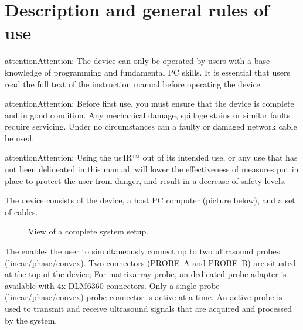 \documentclass[letterpaper,10pt,english]{sphinxmanual}
\begin{document}
\sphinxstepscope


\chapter{Description and general rules of use}
\label{\detokenize{content/hardware:description-and-general-rules-of-use}}\label{\detokenize{content/hardware::doc}}
\begin{sphinxadmonition}{attention}{Attention:}
\sphinxAtStartPar
The device can only be operated by users with a base knowledge of programming and fundamental PC skills. It is essential that users read the full text of the instruction manual before operating the device.
\end{sphinxadmonition}

\begin{sphinxadmonition}{attention}{Attention:}
\sphinxAtStartPar
Before first use, you must ensure that the device is complete and in good condition. Any mechanical damage, spillage stains or similar faults require servicing. Under no circumstances can a faulty or damaged network cable be used.
\end{sphinxadmonition}

\begin{sphinxadmonition}{attention}{Attention:}
\sphinxAtStartPar
Using the us4R™ out of its intended use, or any use that has not been delineated in this manual, will lower the effectiveness of measures put in place to protect the user from danger, and result in a decrease of safety levels.
\end{sphinxadmonition}

\sphinxAtStartPar
The device consists of the  device, a host PC computer (picture below), and a set of cables.

\begin{figure}[htbp]
\centering
\capstart

\noindent{}
\caption{View of a complete system setup.}\label{\detokenize{content/hardware:id1}}\end{figure}

\sphinxAtStartPar
{}

\sphinxAtStartPar
The  enables the user to simultaneously connect up to two ultrasound probes (linear/phase/convex). Two connectors (PROBE A and PROBE B) are situated at the top of the device; For matrix\sphinxhyphen{}array probe, an dedicated probe adapter is available with 4x DLM6\sphinxhyphen{}360 connectors.
Only a single probe (linear/phase/convex) probe connector is active at a time. An active probe is used to transmit and receive ultrasound signals that are acquired and processed by the system.
\end{document}
